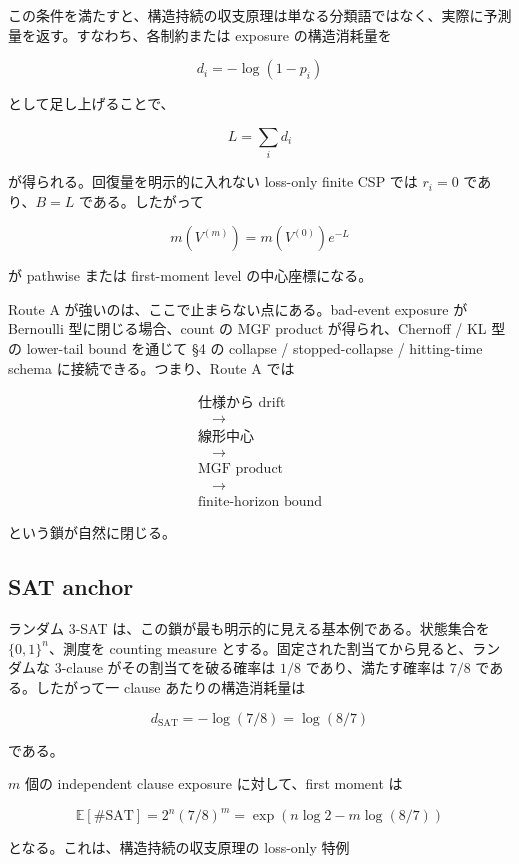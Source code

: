 \documentclass[12pt,a4paper]{article}
\begin{document}
この条件を満たすと、構造持続の収支原理は単なる分類語ではなく、実際に予測量を返す。すなわち、各制約または exposure の構造消耗量を

\[
d_{i} = -\log(1-p_{i})
\]

として足し上げることで、

\[
L = \sum_{i} d_{i}
\]

が得られる。回復量を明示的に入れない loss-only finite CSP では \(r_{i}=0\) であり、\(B=L\) である。したがって

\[
m(V^{(m)}) = m(V^{(0)})e^{-L}
\]

が pathwise または first-moment level の中心座標になる。

Route A が強いのは、ここで止まらない点にある。bad-event exposure が Bernoulli 型に閉じる場合、count の MGF product が得られ、Chernoff / KL 型の lower-tail bound を通じて §4 の collapse / stopped-collapse / hitting-time schema に接続できる。つまり、Route A では

\[
\begin{aligned}
\text{仕様から drift} \\
\quad\to\quad \\
\text{線形中心} \\
\quad\to\quad \\
\text{MGF product} \\
\quad\to\quad \\
\text{finite-horizon bound}
\end{aligned}
\]

という鎖が自然に閉じる。

\subsection{SAT anchor}\label{sat-anchor}

ランダム 3-SAT は、この鎖が最も明示的に見える基本例である。状態集合を \(\{0,1\}^n\)、測度を counting measure とする。固定された割当てから見ると、ランダムな 3-clause がその割当てを破る確率は \(1/8\) であり、満たす確率は \(7/8\) である。したがって一 clause あたりの構造消耗量は

\[
d_{\mathrm{SAT}} = -\log(7/8) = \log(8/7)
\]

である。

\(m\) 個の independent clause exposure に対して、first moment は

\[
\mathbb E[\#\mathrm{SAT}] = 2^n(7/8)^m = \exp(n\log 2 - m\log(8/7))
\]

となる。これは、構造持続の収支原理の loss-only 特例
\end{document}
